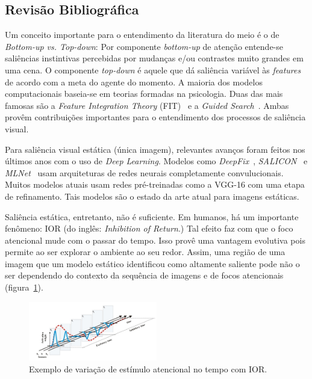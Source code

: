 \documentclass[article]{IEEEtran}
\newcommand{\tit}[1]{\textit{#1}}
\begin{document}
\subsection{Revisão Bibliográfica}
Um conceito importante para o entendimento da literatura do meio é o de
\tit{Bottom-up vs. Top-down}: Por componente \tit{bottom-up} de
atenção entende-se saliências instintivas percebidas por mudanças
e/ou contrastes muito grandes em uma cena. O componente \tit{top-down}
é aquele que dá saliência variável às \tit{features} de acordo
com a meta do agente do momento.
A maioria dos modelos computacionais baseia-se em teorias formadas na
psicologia.
Duas das mais famosas são a \tit{Feature Integration Theory}
(FIT)~\cite{TreismanGelade1980} e a
\tit{Guided Search}~\cite{Wolfe1989}.
Ambas provêm contribuições importantes para o entendimento dos processos
de saliência visual.

Para saliência visual estática (única imagem),
relevantes avanços foram feitos nos últimos anos com o uso de
\tit{Deep Learning}.
Modelos como \tit{DeepFix}~\cite{deepfix}, \tit{SALICON}~\cite{salicon} e
\tit{MLNet}~\cite{mlnet} usam arquiteturas de redes neurais completamente
convulucionais. Muitos modelos atuais usam redes pré-treinadas como a
VGG-16 com uma etapa de refinamento.
Tais modelos são o estado da arte atual para imagens estáticas.

Saliência estática, entretanto, não é suficiente.
Em humanos, há um importante fenômeno: IOR
(do inglês: \tit{Inhibition of Return}.)
Tal efeito faz com que o foco atencional mude com o passar do tempo.
Isso provê uma vantagem evolutiva pois permite ao ser explorar o ambiente ao
seu redor.
Assim, uma região de uma imagem que um modelo estático identificou como
altamente saliente pode não o ser dependendo do contexto da sequência
de imagens e de focos atencionais (figura~\ref{fig:ior}).

\begin{center}
\begin{figure}[t]
\includegraphics[width=0.5\textwidth]{./img/ior.png}
\caption{Exemplo de variação de estímulo atencional no tempo com IOR.}
\label{fig:ior}
\end{figure}
\end{center}
\end{document}
